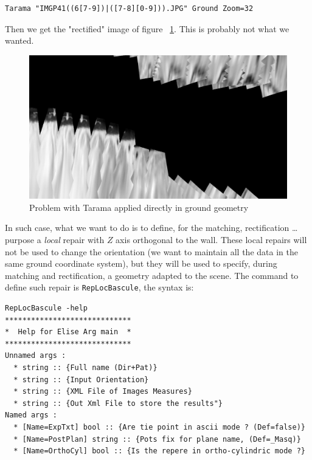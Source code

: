 \begin{verbatim}
Tarama "IMGP41((6[7-9])|([7-8][0-9])).JPG" Ground Zoom=32
\end{verbatim}

Then we get the "rectified" image of figure ~\ref{FIG:PBRec:StMartin}. This
is probably not what we wanted.


\begin{figure}
\begin{center}
\includegraphics[width=120mm]{FIGS/MurSaintMartin/TA_PB_LeChantier.jpg}
\end{center}
\caption{Problem with Tarama applied directly in ground geometry}
\label{FIG:PBRec:StMartin}
\end{figure}

In such case, what we want to do is to define, for the matching, rectification \dots
purpose a \emph{local} repair with $Z$ axis orthogonal to the wall. These local repairs
will not be used to change the orientation (we want to maintain all the data in the
same ground coordinate system), but they will be used to specify, during matching
and rectification, a geometry adapted to the scene.
The command to define such repair is {\tt RepLocBascule}, the syntax is:

\begin{verbatim}
RepLocBascule -help
*****************************
*  Help for Elise Arg main  *
*****************************
Unnamed args :
  * string :: {Full name (Dir+Pat)}
  * string :: {Input Orientation}
  * string :: {XML File of Images Measures}
  * string :: {Out Xml File to store the results"}
Named args :
  * [Name=ExpTxt] bool :: {Are tie point in ascii mode ? (Def=false)}
  * [Name=PostPlan] string :: {Pots fix for plane name, (Def=_Masq)}
  * [Name=OrthoCyl] bool :: {Is the repere in ortho-cylindric mode ?}
\end{verbatim}

